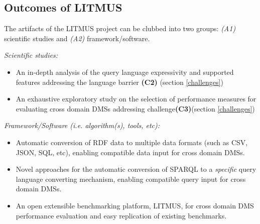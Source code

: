 \documentclass{llncs}
\newcommand{\todoproofread}[3]{
    \todoitemtemplate{#1}{#2}{Please proof read above section; #3}{inline}{yellow}
}
\newcommand{\todoitemtemplate}[5]{%
\todo[#4,color=#5,caption=X]{{#1}{ \textbf{{\tiny{for}} #2}:}{#3}}%
}
\begin{document}
    \subsection{Outcomes of LITMUS}\label{outcomes}
    The artifacts of the LITMUS project can be clubbed into two groups: \textit{(A1)} scientific studies and \textit{(A2)} framework/software. 
    
    \textit{Scientific studies:} 
        \begin{itemize}[nosep]
            \item An in-depth analysis of the query language expressivity and supported features addressing the language barrier \textbf{(C2)} (section \ref{challenges})
            \item An exhaustive exploratory study on the selection of performance measures for evaluating cross domain DMSs addressing challenge\textbf{(C3)}(section \ref{challenges})
        \end{itemize}
        
         \textit{Framework/Software (i.e. algorithm(s), tools, etc):} 
        \begin{itemize}[nosep]
            \item Automatic conversion of RDF data to multiple data formats (such as CSV, JSON, SQL, etc), enabling compatible data input for cross domain DMSs. 
            \item Novel approaches for the automatic conversion of SPARQL to a \textit{specific} query language converting mechanism, enabling compatible query input for cross domain DMSs.
            \item An open extensible benchmarking platform, LITMUS, for cross domain DMS performance evaluation and easy replication of existing benchmarks.
        \end{itemize}       
\end{document}
